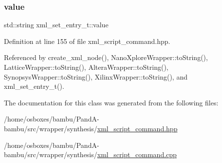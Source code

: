 \subsubsection{\texorpdfstring{value}{value}}
{\footnotesize\ttfamily std\+::string xml\+\_\+set\+\_\+entry\+\_\+t\+::value}



Definition at line 155 of file xml\+\_\+script\+\_\+command.\+hpp.



Referenced by create\+\_\+xml\+\_\+node(), Nano\+Xplore\+Wrapper\+::to\+String(), Lattice\+Wrapper\+::to\+String(), Altera\+Wrapper\+::to\+String(), Synopsys\+Wrapper\+::to\+String(), Xilinx\+Wrapper\+::to\+String(), and xml\+\_\+set\+\_\+entry\+\_\+t().



The documentation for this class was generated from the following files\+:\begin{DoxyCompactItemize}
\item 
/home/osboxes/bambu/\+Pand\+A-\/bambu/src/wrapper/synthesis/\hyperlink{xml__script__command_8hpp}{xml\+\_\+script\+\_\+command.\+hpp}\item 
/home/osboxes/bambu/\+Pand\+A-\/bambu/src/wrapper/synthesis/\hyperlink{xml__script__command_8cpp}{xml\+\_\+script\+\_\+command.\+cpp}\end{DoxyCompactItemize}
